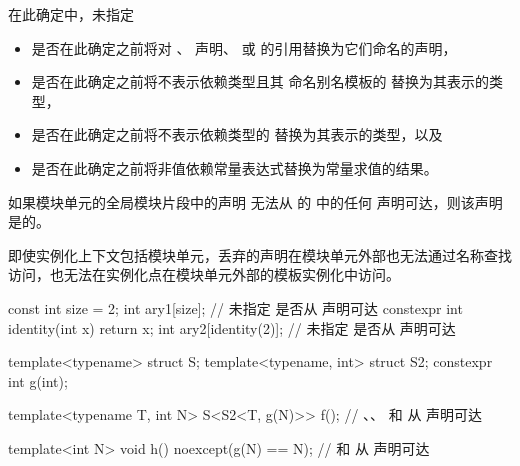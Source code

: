 在此确定中，未指定
\begin{itemize}
\item
是否在此确定之前将对 、 声明、 或  的引用替换为它们命名的声明，

\item
是否在此确定之前将不表示依赖类型且其  命名别名模板的  替换为其表示的类型，

\item
是否在此确定之前将不表示依赖类型的  替换为其表示的类型，以及

\item
是否在此确定之前将非值依赖常量表达式替换为常量求值的结果。
\end{itemize}

\pnum
如果模块单元的全局模块片段中的声明  无法从  的  中的任何  声明可达，则该声明  是的。
\begin{note}
即使实例化上下文包括模块单元，丢弃的声明在模块单元外部也无法通过名称查找访问，也无法在实例化点在模块单元外部的模板实例化中访问。
\end{note}

\pnum
\begin{example}
\begin{codeblock}
const int size = 2;
int ary1[size];                 // 未指定  是否从  声明可达
constexpr int identity(int x) { return x; }
int ary2[identity(2)];          // 未指定  是否从  声明可达

template<typename> struct S;
template<typename, int> struct S2;
constexpr int g(int);

template<typename T, int N>
S<S2<T, g(N)>> f();             // 、、 和 \tcode{::} 从  声明可达

template<int N>
void h() noexcept(g(N) == N);   //  和 \tcode{::} 从  声明可达
\end{codeblock}
\end{example}

